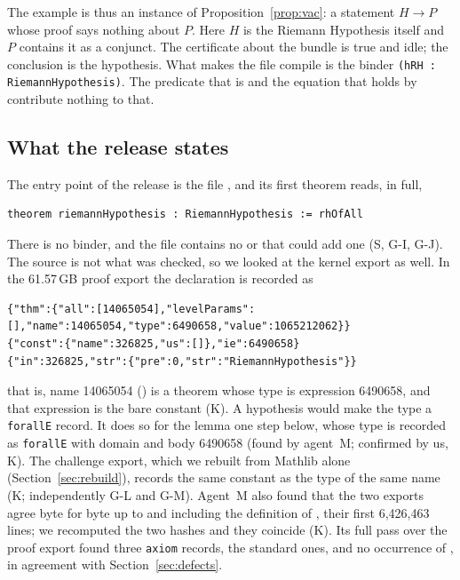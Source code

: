 The example is thus an instance of Proposition~\ref{prop:vac}: a statement $H \to P$ whose proof says nothing about $P$. Here $H$ is the Riemann Hypothesis itself and $P$ contains it as a conjunct.
The certificate about the bundle is true and idle; the conclusion is the hypothesis.
What makes the file compile is the binder \texttt{(hRH : RiemannHypothesis)}. The predicate that is  and the equation that holds by  contribute nothing to that.

\subsection{What the release states}

The entry point of the release is the file , and its first theorem reads, in full,
\begin{Verbatim}[fontsize=\small,frame=single,rulecolor=\color{gray!50}]
theorem riemannHypothesis : RiemannHypothesis := rhOfAll
\end{Verbatim}
\noindent There is no binder, and the file contains no  or  that could add one (\textsf{S}, \textsf{G-I}, \textsf{G-J}).
The source is not what was checked, so we looked at the kernel export as well. In the 61.57\,GB proof export the declaration is recorded as
\begin{Verbatim}[fontsize=\scriptsize,frame=single,rulecolor=\color{gray!50},breaklines=true,breakanywhere=true]
{"thm":{"all":[14065054],"levelParams":[],"name":14065054,"type":6490658,"value":1065212062}}
{"const":{"name":326825,"us":[]},"ie":6490658}
{"in":326825,"str":{"pre":0,"str":"RiemannHypothesis"}}
\end{Verbatim}
\noindent that is, name 14065054 () is a theorem whose type is expression 6490658, and that expression is the bare constant  (\textsf{K}).
A hypothesis would make the type a \texttt{forallE} record. It does so for the lemma  one step below, whose type is recorded as
\texttt{forallE} with domain  and body 6490658 (found by agent~M; confirmed by us, \textsf{K}).
The challenge export, which we rebuilt from Mathlib alone (Section~\ref{sec:rebuild}), records the same constant as the type of the same name (\textsf{K}; independently \textsf{G-L} and \textsf{G-M}).
Agent~M also found that the two exports agree byte for byte up to and including the definition of , their first 6,426,463 lines; we recomputed the two hashes and they coincide (\textsf{K}).
Its full pass over the proof export found three \texttt{axiom} records, the standard ones, and no occurrence of , in agreement with Section~\ref{sec:defects}.


